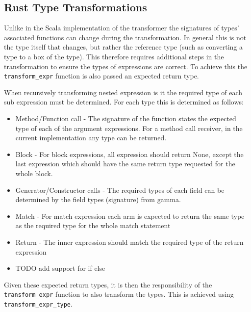 \documentclass[ oneside,%
                    author={James Elgar},
                    degree={MEng},
                     title={Bidirectional transformer between functional and \\ object-oriented programming in Rust},
                  subtitle={}]{dissertation}
\begin{document}
\subsection{Rust Type Transformations}


Unlike in the Scala implementation of the transformer the signatures of types' associated functions can change during the transformation. In general this is not the type itself that changes, but rather the reference type (such as converting a type to a box of the type). This therefore requires additional steps in the transformation to ensure the types of expressions are correct. To achieve this the \verb|transform_expr| function is also passed an expected return type.

When recursively transforming nested expression is it the required type of each sub expression must be determined. For each type this is determined as follows:

\begin{itemize}
    \item Method/Function call - The signature of the function states the expected type of each of the argument expressions. For a method call receiver, in the current implementation any type can be returned. %
    \item Block - For block expressions, all expression should return None, except the last expression which should have the same return type requested for the whole block.
    \item Generator/Constructor calls - The required types of each field can be determined by the field types (signature) from gamma.
    \item Match - For match expression each arm is expected to return the same type as the required type for the whole match statement
    \item Return - The inner expression should match the required type of the return expression
    \item TODO add support for if else  
\end{itemize}

Given these expected return types, it is then the responsibility of the \verb|transform_expr| function to also transform the types. This is achieved using \verb|transform_expr_type|.  
\end{document}
